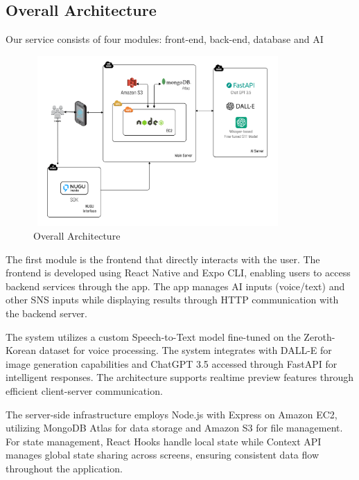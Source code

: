     \subsection{Overall Architecture}
        Our service consists of four modules: front-end, back-end, database and AI\\
            \begin{figure}[htbp]
                \centerline{\includegraphics[width = 9.5cm, height = 6.5cm]{Images/struct/arc.png}}
                \label{fig}
                \caption{Overall Architecture}
            \end{figure}
            
                The first module is the frontend that directly interacts with the user. The frontend is developed using React Native and Expo CLI, enabling users to access backend services through the app. The app manages AI inputs (voice/text) and other SNS inputs while displaying results through HTTP communication with the backend server.
                
                The system utilizes a custom Speech-to-Text model fine-tuned on the Zeroth-Korean dataset for voice processing. The system integrates with DALL-E for image generation capabilities and ChatGPT 3.5 accessed through FastAPI for intelligent responses. The architecture supports realtime preview features through efficient client-server communication.
                
                The server-side infrastructure employs Node.js with Express on Amazon EC2, utilizing MongoDB Atlas for data storage and Amazon S3 for file management. For state management, React Hooks handle local state while Context API manages global state sharing across screens, ensuring consistent data flow throughout the application.
            

